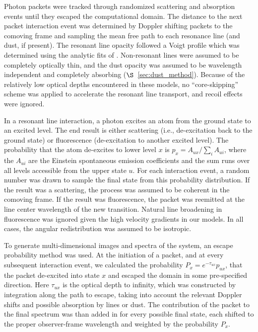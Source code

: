 \documentclass[12pt,preprint]{aastex}
\begin{document}
Photon packets were tracked through randomized scattering and
absorption events until they escaped the computational domain.  The
distance to the next packet interaction event was determined by
Doppler shifting packets to the comoving frame and sampling the mean
free path to each resonance line (and dust, if present).  The resonant
line opacity followed a Voigt profile which was determined using the
analytic fits of  \cite{Tomi_2006}.      Non-resonant lines were
assumed to be completely optically thin, and the dust opacity was
assumed to be wavelength independent and completely absorbing
($\S$~\ref{sec:dust_method}).
Because of the relatively low optical depths encountered in
these models, no ``core-skipping'' scheme was applied to accelerate
the resonant line transport,  and recoil effects were ignored. 

In a resonant line interaction, a photon excites an atom from the ground state to an excited level.  The end result is either scattering (i.e., de-excitation back to the ground state) or fluorescence (de-excitation to another excited  level).  The probability that the atom de-excites to lower level $x$ is  $p_{x} = A_{ux} / \sum_i A_{ui}$, where the $A_{ui}$ are the Einstein spontaneous emission coefficients and the sum runs over all levels accessible from the upper state $u$.  
For each interaction event, a random number was drawn to sample the final state from this probability distribution.    If the result was a scattering, the process was assumed to be coherent in the comoving frame.  If the result was fluorescence, the packet was  reemitted at the line center wavelength of the new transition.  Natural line broadening in fluorescence was ignored given the high velocity gradients in our models.  In all cases, the angular redistribution was  assumed to be isotropic.

To generate multi-dimensional images and spectra of the system, an escape probability method was used.  At the initiation of a packet, and at every subsequent interaction event, we calculated the probability $P_x = e^{-\tau_{ux}} p_{ux}$,  that the packet de-excited into state $x$ and escaped the domain in some pre-specified direction. Here
$\tau_{ux}$ is the optical depth to infinity, which was  constructed  by integration along the path to escape, taking into account the relevant Doppler shifts and possible absorption by lines or dust.  The contribution of the packet to the final spectrum was than added in for every possible final state, each shifted to the proper observer-frame wavelength and weighted by the probability $P_x$.
\end{document}
